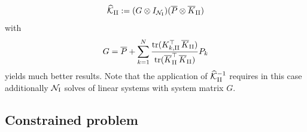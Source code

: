 \documentclass[a4paper,10pt]{article}
\newcommand{\cK}{{\mathcal{K}}}
\numberwithin{theorem}{section}
\begin{document}
\begin{equation*}
	\widehat \cK_{\textup{II}} := (G\otimes I_{\mathcal{N}_{\textup{I}}})(\overline P\otimes \overline K_{\textup{II}})
\end{equation*}
with
\begin{equation*}
	G = \overline P + \sum_{k=1}^N \frac{\text{tr}(K_{k,\textup{II}}^\top\,\overline K_{\textup{II}})}{\text{tr}(\overline K_{\textup{II}}^\top\,\overline K_{\textup{II}})} P_k
\end{equation*}
yields much better results.
Note that the application of $\widehat\cK_{\textup{II}}^{-1}$ requires in this case additionally $\mathcal{N}_{\textup{I}}$ solves of linear systems with system matrix $G$.

\subsection{Constrained problem}
\label{sec:constrained_problem}
\end{document}
